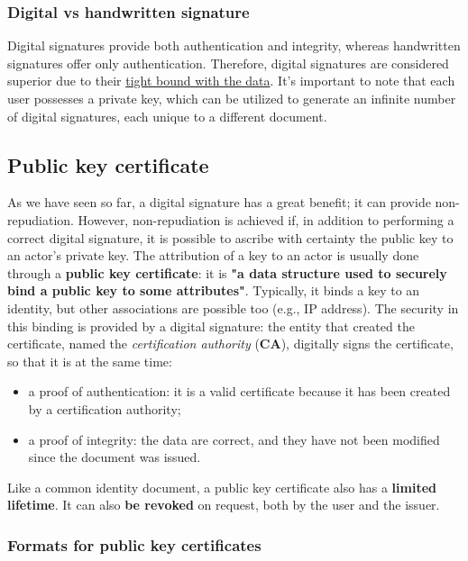 \subsubsection{Digital vs handwritten signature}
Digital signatures provide both authentication and integrity, whereas handwritten signatures offer only authentication. Therefore, digital signatures are considered superior due to their \underline{tight bound with the data}. It's important to note that each user possesses a private key, which can be utilized to generate an infinite number of digital signatures, each unique to a different document.


\subsection{Public key certificate}\label{chap:public-key-certificate}
As we have seen so far, a digital signature has a great benefit; it can provide non-repudiation. 
However, non-repudiation is achieved if, in addition to performing a correct digital signature, it is possible to ascribe with certainty the public key to an actor's private key. 
The attribution of a key to an actor is usually done through a \textbf{public key certificate}: it is \textbf{"a data structure used to securely bind a public key to some attributes"}. 
Typically, it binds a key to an identity, but other associations are possible too (e.g., IP address). 
The security in this binding is provided by a digital signature: the entity that created the certificate, named the \textit{certification authority} (\textbf{CA}), digitally signs the certificate, so that it is at the same time:
\begin{itemize}
    \item a proof of authentication: it is a valid certificate because it has been created by a certification authority;
    \item a proof of integrity: the data are correct, and they have not been modified since the document was issued.
\end{itemize}

Like a common identity document, a public key certificate also has a \textbf{limited lifetime}. It can also \textbf{be
revoked} on request, both by the user and the issuer.


\subsubsection{Formats for public key certificates}

